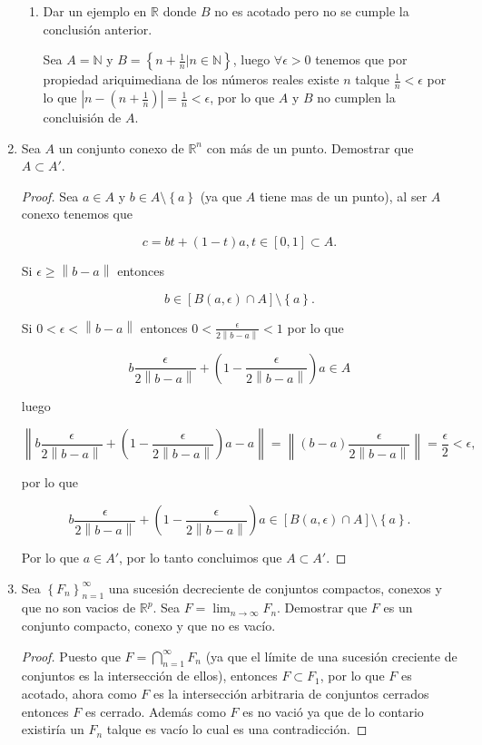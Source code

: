 \documentclass[letterpaper]{article}
\theoremstyle{definition}
\theoremstyle{lemathm}
\theoremstyle{lemathm}
\theoremstyle{lemathm}
\theoremstyle{lemademthm}
\newcommand{\limtoinf}[1]{\lim_{#1\to\infty}}
\newcommand{\abs}[1]{\left| #1 \right| }
\newcommand{\pars}[1]{\left( #1 \right) }
\newcommand{\bracs}[1]{\left[ #1 \right] }
\newcommand{\norm}[1]{\left\lVert#1\right\rVert}
\newcommand{\set}[1]{\left \{ #1 \right\} }
\newcommand{\NN}{\mathbb{N}}
\newcommand{\RR}{\mathbb{R}}
\newcommand{\1}{\mathbbm{1}}
\begin{document}
\begin{enumerate}
\begin{enumerate}
			\item Dar un ejemplo en $\RR$ donde $B$ no es acotado pero no se cumple la conclusión anterior.
			
			Sea $A = \NN$ y $B = \set{n + \frac{1}{n}| n\in\NN}$, luego $\forall \epsilon > 0$ tenemos que por propiedad ariquimediana de los números reales existe $n$ talque $\frac{1}{n} < \epsilon$ por lo que $\abs{n - \pars{n + \frac{1}{n}}} = \frac{1}{n} < \epsilon$, por lo que $A$ y $B$ no cumplen la concluisión de $A$.
		\end{enumerate}

		\item Sea $A$ un conjunto conexo de $\RR^n$ con más de un punto. Demostrar que $A\subset A'$.
		
		\begin{proof}
			Sea $a\in A$ y $b\in A\setminus\set{a}$ (ya que $A$ tiene mas de un punto), al ser $A$ conexo tenemos que 
			
			\[{c = bt + (1-t)a, t\in\bracs{0,1}} \subset A.\]
			
			Si $\epsilon \geq \norm{b-a}$ entonces 
			
			\[b \in \bracs{B\pars{a,\epsilon}\cap A} \setminus \set{a}.\]
			
			Si $0<\epsilon < \norm{b-a}$ entonces $0<\frac{\epsilon}{2\norm{b-a}} < 1$ por lo que 
			
			\[b\frac{\epsilon}{2\norm{b-a}} + \pars{1-\frac{\epsilon}{2\norm{b-a}}}a \in A\] 
			
			luego 

			\[\norm{b\frac{\epsilon}{2\norm{b-a}} + \pars{1-\frac{\epsilon}{2\norm{b-a}}}a - a} = \norm{\pars{b-a}\frac{\epsilon}{2\norm{b-a}}} = \frac{\epsilon}{2} < \epsilon,\]

			por lo que

			\[b\frac{\epsilon}{2\norm{b-a}} + \pars{1-\frac{\epsilon}{2\norm{b-a}}}a \in \bracs{B\pars{a,\epsilon}\cap A} \setminus \set{a}.\]

			Por lo que $a\in A'$, por lo tanto concluimos que $A\subset A'$.
		\end{proof}

		\item Sea $\set{F_n}_{n=1}^{\infty}$ una sucesión decreciente de conjuntos compactos, conexos y que no son vacios de $\RR^p$. Sea $F = \limtoinf{n} F_n$. Demostrar que $F$ es un conjunto compacto, conexo y que no es vacío.
		
		\begin{proof}
			Puesto que $F = \bigcap_{n=1}^{\infty} F_n$ (ya que el límite de una sucesión creciente de conjuntos es la intersección de ellos), entonces $F \subset F_1$, por lo que $F$ es acotado, ahora como $F$ es la intersección arbitraria de conjuntos cerrados entonces $F$ es cerrado. Además como $F$ es no vació ya que de lo contario existiría un $F_n$ talque es vacío lo cual es una contradicción. 
			

\end{proof}
\end{enumerate}
\end{document}
